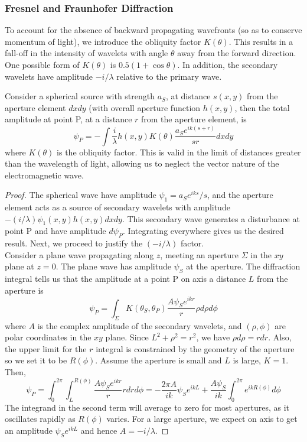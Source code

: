 \documentclass[a4paper]{article}
\begin{document}
\subsubsection*{Fresnel and Fraunhofer Diffraction}
\begin{Note}
To account for the absence of backward propagating wavefronts (so as to conserve momentum of light), we introduce the obliquity factor $K(\theta)$. This results in a fall-off in the intensity of wavelets with angle $\theta$ away from the forward direction. One possible form of $K(\theta)$ is $0.5(1+\cos\theta)$. In addition, the secondary wavelets have amplitude $-i/\lambda$ relative to the primary wave.
\end{Note}
\begin{thm}
Consider a spherical source with strength $a_S$, at distance $s(x,y)$ from the aperture element $dxdy$ (with overall aperture function $h(x,y)$, then the total amplitude at point P, at a distance $r$ from the aperture element, is
$$\psi_P=-\int\frac{i}{\lambda}h(x,y)K(\theta)\frac{a_Se^{ik(s+r)}}{sr}dxdy$$
where $K(\theta)$ is the obliquity factor. This is valid in the limit of distances greater than the wavelength of light, allowing us to neglect the vector nature of the electromagnetic wave.
\end{thm}
\begin{proof}
The spherical wave have amplitude $\psi_1=a_Se^{iks}/s$, and the aperture element acts as a source of secondary wavelets with amplitude $-(i/\lambda)\psi_1(x,y)h(x,y)dxdy$. This secondary wave generates a disturbance at point P and have amplitude $d\psi_P$. Integrating everywhere gives us the desired result. Next, we proceed to justify the $(-i/\lambda)$ factor.\\[5pt] Consider a plane wave propagating along $z$, meeting an aperture $\Sigma$ in the $xy$ plane at $z=0$. The plane wave has amplitude $\psi_S$ at the aperture. The diffraction integral tells us that the amplitude at a point P on axis a distance $L$ from the aperture is
$$\psi_P=\int_\Sigma K(\theta_S,\theta_P)\frac{A\psi_Se^{ikr}}{r}\rho d\rho d\phi$$
where $A$ is the complex amplitude of the secondary wavelets, and $(\rho,\phi)$ are polar coordinates in the $xy$ plane. Since $L^2+\rho^2=r^2$, we have $\rho d\rho=rdr$. Also, the upper limit for the $r$ integral is constrained by the geometry of the aperture so we set it to be $R(\phi)$. Assume the aperture is small and $L$ is large, $K=1$. Then,
$$\psi_P=\int_0^{2\pi}\int_L^{R(\phi)}\frac{A\psi_Se^{ikr}}{r}rdrd\phi=-\frac{2\pi A}{ik}\psi_Se^{ikL}+\frac{A\psi_S}{ik}\int_0^{2\pi}e^{ikR(\phi)}d\phi$$
The integrand in the second term will average to zero for most apertures, as it oscillates rapidly as $R(\phi)$ varies. For a large aperture, we expect on axis to get an amplitude $\psi_Se^{ikL}$ and hence $A=-i/\lambda$.
\end{proof}
\end{document}

